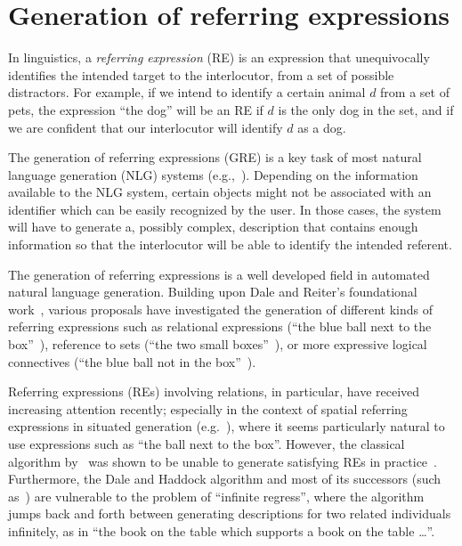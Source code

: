 \section{Generation of referring expressions}\label{sec:gre}

In linguistics, a \emph{referring expression} (RE) is an expression that 
unequivocally identifies the intended target to the interlocutor, from a set of possible distractors.  
For example, if we intend to identify a certain animal $d$ from a set of pets, the expression 
``the dog'' will be an RE if $d$ is the only dog in the set, and if we are confident
that our interlocutor will identify $d$ as a dog. 

The generation of referring expressions (GRE)  is a key task of most natural 
language generation (NLG) systems (e.g.,~\cite[Section 5.4]{dale2000}). 
Depending on the information available to the NLG system, certain objects might 
not be associated with an identifier which can be easily recognized by the user. 
In those cases, the system will have to generate a, possibly complex, description that contains 
enough information so that the interlocutor will be able to identify the intended referent.

The generation of referring expressions is a well developed field in automated natural language generation.
Building upon Dale and Reiter's foundational work~\cite{dale89cooking,Dale1995},
various proposals have investigated the generation of different kinds of referring expressions 
such as relational expressions (``the blue ball next to the box''~\cite{dale91:_gener_refer_expres_invol_relat}),
reference to sets (``the two small boxes''~\cite{Stone2000}), or more expressive logical connectives (``the 
blue ball not in the box''~\cite{deemter02:_gener_refer_expres}).

Referring expressions (REs) involving relations, in particular, have
received increasing attention recently; especially in the context of
spatial referring expressions in situated generation (e.g.~\cite{kelleher06:_increm_gener_of_spatial_refer}), where it seems
particularly natural to use expressions such as ``the ball next to the box''.  However, the classical algorithm by~\cite{dale91:_gener_refer_expres_invol_relat} was shown to be unable to generate satisfying REs in practice~\cite{viethen06:_algor_for_gener_refer_expres}.  Furthermore, the Dale
and Haddock algorithm and most of its successors (such as~\cite{kelleher06:_increm_gener_of_spatial_refer}) are vulnerable to
the problem of ``infinite regress'', where the algorithm jumps back
and forth between generating descriptions for two related individuals
infinitely, as in ``the book on the table which supports a book on the
table \ldots''.

